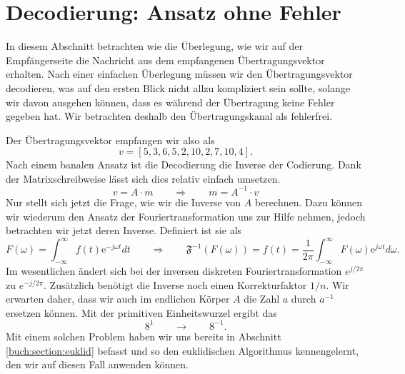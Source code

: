%
%
%
\section{Decodierung: Ansatz ohne Fehler
\label{reedsolomon:section:decohnefehler}}

In diesem Abschnitt betrachten wie die Überlegung, wie wir auf der Empfängerseite die Nachricht aus dem empfangenen Übertragungsvektor erhalten. Nach einer einfachen Überlegung müssen wir den Übertragungsvektor decodieren, was auf den ersten Blick nicht allzu kompliziert sein sollte, solange wir davon ausgehen können, dass es während der Übertragung keine Fehler gegeben hat. Wir betrachten deshalb den Übertragungskanal als fehlerfrei.

Der Übertragungsvektor empfangen wir also als
\[
v = [5,3,6,5,2,10,2,7,10,4].
\]
Nach einem banalen Ansatz ist die Decodierung die Inverse der Codierung. Dank der Matrixschreibweise lässt sich dies relativ einfach umsetzen.
\[
v = A \cdot m \qquad \Rightarrow \qquad m = A^{-1} \cdot v
\]
Nur stellt sich jetzt die Frage, wie wir die Inverse von $A$ berechnen.
Dazu können wir wiederum den Ansatz der Fouriertransformation uns zur Hilfe nehmen,
jedoch betrachten wir jetzt deren Inverse.
Definiert ist sie als
\[
F(\omega) = \int_{-\infty}^{\infty} f(t) \mathrm{e}^{-j\omega t} dt \qquad \Rightarrow \qquad \mathfrak{F}^{-1}(F(\omega)) = f(t) = \frac{1}{2 \pi} \int_{-\infty}^{\infty} F(\omega) \mathrm{e}^{j \omega t} d\omega.
\]
Im wesentlichen ändert sich bei der inversen diskreten Fouriertransformation $e^{j/2\pi}$ zu $e^{-j/2\pi}$. Zusätzlich benötigt die Inverse noch einen Korrekturfaktor $1/n$. Wir erwarten daher, dass wir auch im endlichen Körper $A$ die Zahl $a$ durch $a^{-1}$ ersetzen können. Mit der primitiven Einheitswurzel ergibt das 
%
\[
8^1 \qquad \rightarrow \qquad 8^{-1}.
\]
Mit einem solchen Problem haben wir uns bereits in Abschnitt \ref{buch:section:euklid} befasst und so den euklidischen Algorithmus kennengelernt, den wir auf diesen Fall anwenden können.

